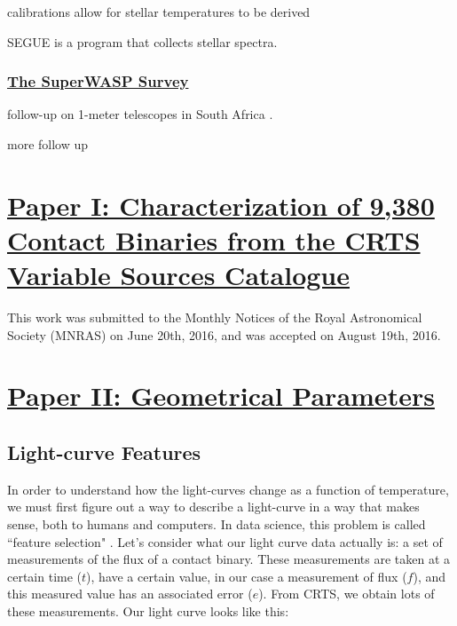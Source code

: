 \documentclass[12pt]{article} %
\numberwithin{equation}{section} %
\begin{document}
\cite{york2000sloan}

\citep{ivezic2007sloan} 

calibrations allow for stellar temperatures to be derived \cite{fukugita2011characterization}

SEGUE is a program that collects stellar spectra.

\subsubsection[The SuperWASP Survey]{\hyperlink{toc}{The SuperWASP Survey}}

follow-up on 1-meter telescopes in South Africa \citep{koen2016multi}.

more follow up \citep{darwish2016orbital}

\section[Paper I: Characterization of 9,380 Contact Binaries from the CRTS Variable Sources Catalogue]{\hyperlink{toc}{Paper I: Characterization of 9,380 Contact Binaries from the CRTS Variable Sources Catalogue}} \label{sec: Paper I: Introduction to the CRTS Data}

This work was submitted to the Monthly Notices of the Royal Astronomical Society (MNRAS) on June 20th, 2016, and was accepted on August 19th, 2016.



\section[Paper II: Geometrical Parameters]{\hyperlink{toc}{Paper II: Geometrical Parameters}} \label{sec: Paper II: Geometrical Parameters}

\subsection[Light-curve Features]{Light-curve Features} \label{sec: Light-curve Features}

In order to understand how the light-curves change as a function of temperature, we must first figure out a way to describe a light-curve in a way that makes sense, both to humans and computers. In data science, this problem is called ``feature selection" . Let's consider what our light curve data actually is: a set of measurements of the flux of a contact binary. These measurements are taken at a certain time ($t$), have a certain value, in our case a measurement of flux ($f$), and this measured value has an associated error ($e$). From CRTS, we obtain lots of these measurements. Our light curve looks like this:
\end{document}
